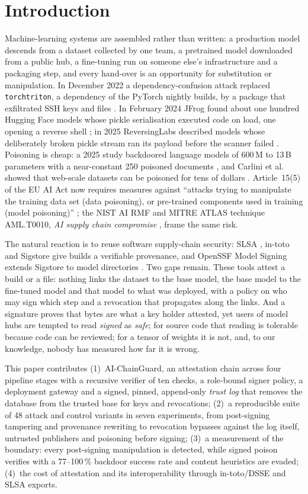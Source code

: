\documentclass[conference]{IEEEtran}
\newcommand{\sys}{AI-ChainGuard}
\begin{document}
\section{Introduction}
Machine-learning systems are assembled rather than written: a production model descends from a dataset collected by one team, a pretrained model downloaded from a public hub, a fine-tuning run on someone else's infrastructure and a packaging step, and every hand-over is an opportunity for substitution or manipulation. In December 2022 a dependency-confusion attack replaced \texttt{torchtriton}, a dependency of the PyTorch nightly builds, by a package that exfiltrated SSH keys and files \cite{pytorch2022}. In February 2024 JFrog found about one hundred Hugging Face models whose pickle serialisation executed code on load, one opening a reverse shell \cite{jfrog2024}; in 2025 ReversingLabs described models whose deliberately broken pickle stream ran its payload before the scanner failed \cite{rl2025}. Poisoning is cheap: a 2025 study backdoored language models of 600\,M to 13\,B parameters with a near-constant 250 poisoned documents \cite{souly2025}, and Carlini et al. showed that web-scale datasets can be poisoned for tens of dollars \cite{carlini2024}. Article~15(5) of the EU AI Act now requires measures against ``attacks trying to manipulate the training data set (data poisoning), or pre-trained components used in training (model poisoning)'' \cite{aiact2024}; the NIST AI RMF \cite{nistairmf} and MITRE ATLAS technique AML.T0010, \emph{AI supply chain compromise} \cite{atlas}, frame the same risk.

The natural reaction is to reuse software supply-chain security: SLSA \cite{slsa11}, in-toto \cite{intoto2019} and Sigstore \cite{sigstore2022} give builds a verifiable provenance, and OpenSSF Model Signing extends Sigstore to model directories \cite{oms2025}. Two gaps remain. These tools attest a build or a file: nothing links the dataset to the base model, the base model to the fine-tuned model and that model to what was deployed, with a policy on who may sign which step and a revocation that propagates along the links. And a signature proves that bytes are what a key holder attested, yet users of model hubs are tempted to read \emph{signed} as \emph{safe}; for source code that reading is tolerable because code can be reviewed; for a tensor of weights it is not, and, to our knowledge, nobody has measured how far it is wrong.

This paper contributes (1)~\sys, an attestation chain across four pipeline stages with a recursive verifier of ten checks, a role-bound signer policy, a deployment gateway and a signed, pinned, append-only \emph{trust log} that removes the database from the trusted base for keys and revocations; (2)~a reproducible suite of 48 attack and control variants in seven experiments, from post-signing tampering and provenance rewriting to revocation bypasses against the log itself, untrusted publishers and poisoning before signing; (3)~a measurement of the boundary: every post-signing manipulation is detected, while signed poison verifies with a \mbox{77--100\,\%} backdoor success rate and content heuristics are evaded; (4)~the cost of attestation and its interoperability through \mbox{in-toto}/DSSE and SLSA exports.
\end{document}
